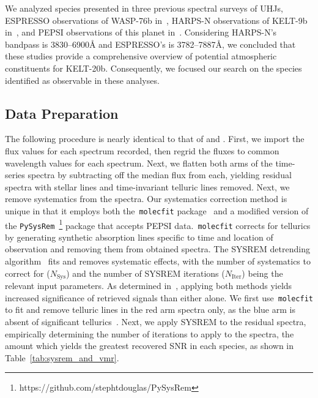 \documentclass[twocolumn]{aastex631}
\newcommand{\code}[1]{\texttt{#1}}
\begin{document}
            We analyzed species presented in three previous spectral surveys of UHJs, ESPRESSO observations of WASP-76b in~\citet{Kesseli2022}, HARPS-N observations of KELT-9b in~\citet{Hoeijmakers2019}, and PEPSI observations of this planet in~\citet{Petz2023}. Considering HARPS-N's bandpass is 3830--6900\AA \citep{Cosentino2012} and ESPRESSO's is 3782--7887\AA\~\citep{Pepe2021}, we concluded that these studies provide a comprehensive overview of potential atmospheric constituents for KELT-20b. Consequently, we focused our search on the species identified as observable in these analyses.
            
        \subsection{Data Preparation}\label{subsec:Data Preparation}
            The following procedure is nearly identical to that of \citet{Johnson2023} and \citet{Petz2023}. First, we import the flux values for each spectrum recorded, then regrid the fluxes to common wavelength values for each spectrum. Next, we flatten both arms of the time-series spectra by subtracting off the median flux from each, yielding residual spectra with stellar lines and time-invariant telluric lines removed. Next, we remove systematics from the spectra. Our systematics correction method is unique in that it employs both the~\code{molecfit} package~\citep{Smette2015, Kausch2015} and a modified version of the \code{PySysRem}~\footnote{https://github.com/stephtdouglas/PySysRem} package that accepts PEPSI data.~\code{molecfit} corrects for tellurics by generating synthetic absorption lines specific to time and location of observation and removing them from obtained spectra. The SYSREM detrending algorithm~\citep{Tamuz2005} fits and removes systematic effects, with the number of systematics to correct for ($N_{\mathrm{Sys}}$) and the number of SYSREM iterations ($N_{\mathrm{Iter}}$) being the relevant input parameters. As determined in~\citet{Johnson2023}, applying both methods yields increased significance of retrieved signals than either alone. We first use~\code{molecfit} to fit and remove telluric lines in the red arm spectra only, as the blue arm is absent of significant tellurics~\citep{Smette2015}. Next, we apply SYSREM to the residual spectra, empirically determining the number of iterations to apply to the spectra, the amount which yields the greatest recovered SNR in each species, as shown in Table~\ref{tab:sysrem_and_vmr}.
\end{document}
